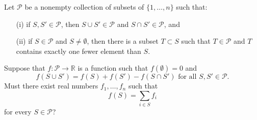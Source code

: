 Let $\mathcal{P}$ be a nonempty collection of subsets of $\{1,\dots, n\}$ such that:
\begin{enumerate}
\item[(i)]
if $S, S' \in \mathcal{P}$, then $S \cup S' \in \mathcal{P}$ and $S \cap S' \in \mathcal{P}$, and
\item[(ii)]
if $S \in \mathcal{P}$ and $S \neq \emptyset$, then there is a subset $T \subset S$
such that $T \in \mathcal{P}$ and $T$ contains exactly one fewer element than $S$.
\end{enumerate}
Suppose that $f: \mathcal{P} \to \mathbb{R}$ is a function such that
$f(\emptyset) = 0$ and
\[
f(S \cup S') = f(S) + f(S') - f(S \cap S') \mbox{ for all $S,S' \in \mathcal{P}$.}
\]
Must there exist real numbers $f_1,\dots,f_n$ such that
\[
f(S) = \sum_{i \in S} f_i
\]
for every $S \in \mathcal{P}$?
